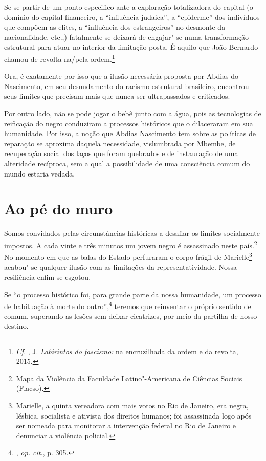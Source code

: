 Se se partir de um ponto especifico ante a exploração totalizadora do
capital (o domínio do capital financeiro, a ``influência judaica'', a
``epiderme'' dos indivíduos que compõem as elites, a ``influência dos
estrangeiros'' no desmonte da nacionalidade, etc.,) fatalmente se
deixará de engajar"-se numa transformação estrutural para atuar no
interior da limitação posta. É aquilo que João Bernardo chamou de
revolta na/pela ordem.\footnote{\emph{Cf}. , J. \emph{Labirintos do
  fascismo:} na encruzilhada da ordem e da revolta, 2015.}

Ora, é exatamente por isso que a ilusão necessária proposta por Abdias
do Nascimento, em seu desnudamento do racismo estrutural brasileiro,
encontrou seus limites que precisam mais que nunca ser ultrapassados e
criticados.

Por outro lado, não se pode jogar o bebê junto com a água, pois as
tecnologias de reificação do negro conduziram a processos históricos que
o dilaceraram em sua humanidade. Por isso, a noção que Abdias Nascimento
tem sobre as políticas de reparação se aproxima daquela necessidade,
vislumbrada por Mbembe, de recuperação social dos laços que foram
quebrados e de instauração de uma alteridade recíproca, sem a qual a
possibilidade de uma consciência comum do mundo estaria vedada.

\chapter{Ao pé do muro}

Somos convidados pelas circunstâncias históricas a desafiar os limites
socialmente impostos. A cada vinte e três minutos um jovem negro é
assassinado neste país.\footnote{Mapa da Violência da Faculdade
  Latino"-Americana de Ciências Sociais (Flacso).} No momento em que as
balas do Estado perfuraram o corpo frágil de Marielle\footnote{Marielle,
  a quinta vereadora com mais votos no Rio de Janeiro, era negra,
  lésbica, socialista e ativista dos direitos humanos; foi assassinada
  logo após ser nomeada para monitorar a intervenção federal no Rio de
  Janeiro e denunciar a violência policial.} acabou"-se qualquer ilusão
com as limitações da representatividade. Nossa resiliência enfim se
esgotou.

Se ``o processo histórico foi, para grande parte da nossa humanidade, um
processo de habituação à morte do outro'',\footnote{, \emph{op. cit.}, p.
  305.} teremos que reinventar o próprio sentido de comum, superando as
lesões sem deixar cicatrizes, por meio da partilha de nosso destino.

